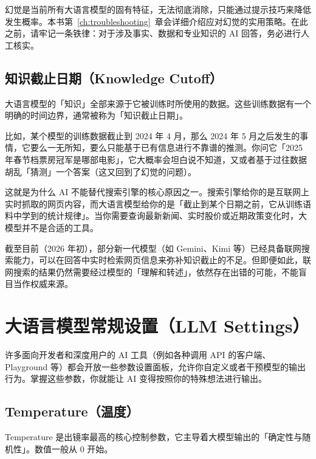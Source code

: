 \begin{tipbox}
幻觉是当前所有大语言模型的固有特征，无法彻底消除，只能通过提示技巧来降低发生概率。本书第~\ref{ch:troubleshooting}~章会详细介绍应对幻觉的实用策略。在此之前，请牢记一条铁律：对于涉及事实、数据和专业知识的 AI 回答，务必进行人工核实。
\end{tipbox}

\subsection*{知识截止日期（Knowledge Cutoff）}
\label{sec:knowledge-cutoff}

大语言模型的「知识」全部来源于它被训练时所使用的数据。这些训练数据有一个明确的时间边界，通常被称为「知识截止日期」。

比如，某个模型的训练数据截止到 2024 年 4 月，那么 2024 年 5 月之后发生的事情，它要么一无所知，要么只能基于已有信息进行不靠谱的推测。你问它「2025 年春节档票房冠军是哪部电影」，它大概率会坦白说不知道，又或者基于过往数据胡乱「猜测」一个答案（这又回到了幻觉的问题）。

这就是为什么 AI 不能替代搜索引擎的核心原因之一。搜索引擎给你的是互联网上实时抓取的网页内容，而大语言模型给你的是「截止到某个日期之前，它从训练语料中学到的统计规律」。当你需要查询最新新闻、实时股价或近期政策变化时，大模型并不是合适的工具。

\begin{tipbox}
截至目前（2026 年初），部分新一代模型（如 Gemini、Kimi 等）已经具备联网搜索能力，可以在回答中实时检索网页信息来弥补知识截止的不足。但即便如此，联网搜索的结果仍然需要经过模型的「理解和转述」，依然存在出错的可能，不能盲目当作权威来源。
\end{tipbox}

\section{大语言模型常规设置（LLM Settings）}

许多面向开发者和深度用户的 AI 工具（例如各种调用 API 的客户端、Playground 等）都会开放一些参数设置面板，允许你自定义或者干预模型的输出行为。掌握这些参数，你就能让 AI 变得按照你的特殊想法进行输出。

\subsection*{Temperature（温度）}
\label{sec:temperature}

Temperature 是出镜率最高的核心控制参数，它主导着大模型输出的「确定性与随机性」。数值一般从 0 开始。

